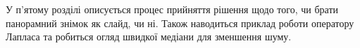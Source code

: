 У  п'ятому розділі описується процес прийняття рішення щодо того,
чи брати панорамний знімок як слайд, чи ні. 
Також наводиться приклад роботи оператору Лапласа та робиться огляд швидкої медіани для
зменшення шуму.
